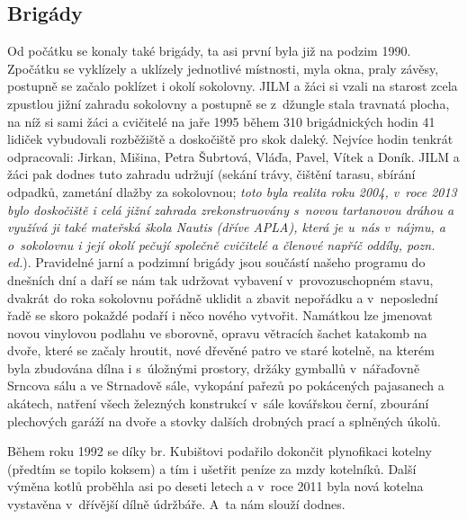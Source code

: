 \documentclass[a5paper, 11pt, twoside]{article}
\newcommand{\pozned}[1]{%
\textit{#1}}
\begin{document}
\subsection{Brigády}

Od počátku se konaly také brigády, ta asi první byla již na podzim 1990.
Zpočátku se vyklízely a uklízely jednotlivé místnosti, myla okna, praly
závěsy, postupně se začalo poklízet i okolí sokolovny. JILM a žáci si
vzali na starost zcela zpustlou jižní zahradu sokolovny a postupně se
z~džungle stala travnatá plocha, na níž si sami žáci a cvičitelé na jaře
1995 během 310 brigádnických hodin 41 lidiček vybudovali rozběžiště a
doskočiště pro skok daleký. Nejvíce hodin tenkrát odpracovali: Jirkan,
Mišina, Petra Šubrtová, Vláďa, Pavel, Vítek a Doník. JILM a žáci pak
dodnes tuto zahradu udržují (sekání trávy, čištění tarasu, sbírání
odpadků, zametání dlažby za sokolovnou; \pozned{toto byla realita roku
2004, v~roce 2013 bylo doskočiště i celá jižní zahrada zrekonstruovány
s~novou tartanovou dráhou a využívá ji také mateřská škola Nautis (dříve
APLA), která je u~nás v~nájmu, a o~sokolovnu i její okolí pečují
společně cvičitelé a členové napříč oddíly, pozn. ed.}). Pravidelné
jarní a podzimní brigády jsou součástí našeho programu do dnešních dní a
daří se nám tak udržovat vybavení v~provozuschopném stavu, dvakrát do
roka sokolovnu pořádně uklidit a zbavit nepořádku a v~neposlední řadě se
skoro pokaždé podaří i něco nového vytvořit. Namátkou lze jmenovat novou
vinylovou podlahu ve sborovně, opravu větracích šachet katakomb na
dvoře, které se začaly hroutit, nové dřevěné patro ve staré kotelně, na
kterém byla zbudována dílna i s~úložnými prostory, držáky gymballů
v~nářaďovně Srncova sálu a ve Strnadově sále, vykopání pařezů po
pokácených pajasanech a akátech, natření všech železných konstrukcí
v~sále kovářskou černí, zbourání plechových garáží na dvoře a stovky
dalších drobných prací a splněných úkolů.

Během roku 1992 se díky br. Kubištovi podařilo dokončit plynofikaci
kotelny (předtím se topilo koksem) a tím i ušetřit peníze za mzdy
kotelníků. Další výměna kotlů proběhla asi po deseti letech a v~roce
2011 byla nová kotelna vystavěna v~dřívější dílně údržbáře. A~ta nám
slouží dodnes.
\end{document}
